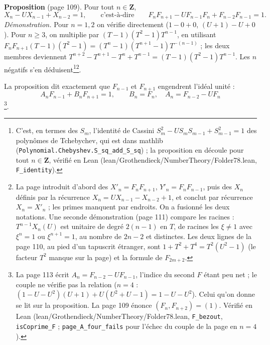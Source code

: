 \documentclass[11pt,a4paper]{article}
\begin{document}
\textbf{Proposition} (page 109). Pour tout $n \in \mathbf{Z}$,
\[
  X_n - U X_{n-1} + X_{n-2} = 1 , \qquad \text{c'est-à-dire} \qquad F_n
  F_{n+1} - U F_{n-1} F_n + F_{n-2} F_{n-1} = 1 .
\]
\emph{Démonstration.} Pour $n = 1, 2$ on vérifie directement ($1 - 0 + 0$,
$(U + 1) - U + 0$). Pour $n \geq 3$, on multiplie par $(T - 1)(T^2 - 1)
T^{n-1}$, en utilisant $F_n F_{n+1} (T - 1)(T^2 - 1) = (T^n - 1)(T^{n+1} - 1)
T^{-(n-1)}$ ; les deux membres deviennent $T^{n+2} - T^{n+1} - T^n + T^{n-1} =
(T - 1)(T^2 - 1) T^{n-1}$. Les $n$ négatifs s'en déduisent\footnote{C'est,
en termes des $S_m$, l'identité de Cassini
$S_m^{2} - U S_m S_{m-1} + S_{m-1}^{2} = 1$ des polynômes de Tchebychev, qui
est dans mathlib (\texttt{Polynomial.Chebyshev.S\_sq\_add\_S\_sq}) ; la
proposition en découle pour tout $n \in \mathbf{Z}$, vérifié en Lean
(lean/Grothendieck/NumberTheory/Folder78.lean, \texttt{F\_identity}).}\footnote{La page
introduit d'abord des $X'_n = F_n F_{n+1}$, $Y'_n = F_n F_{n-1}$, puis des
$X_n$ définis par la récurrence $X_n = U X_{n-1} - X_{n-2} + 1$, et conclut
par récurrence $X_n = X'_n$ ; les primes manquent par endroits. On a fusionné
les deux notations. Une seconde démonstration (page 111) compare les racines :
$T^{n-1} X_n(U)$ est unitaire de degré $2(n-1)$ en $T$, de racines les $\xi
\neq 1$ avec $\xi^n = 1$ ou $\xi^{n+1} = 1$, au nombre de $2n - 2$ et
distinctes. Les deux lignes de la page 110, au pied d'un tapuscrit étranger,
sont $1 + T^2 + T^4 = T^2 (U^2 - 1)$ (le facteur $T^2$ manque sur la page) et
la formule de $F_{2m+2}$.}.

La proposition dit exactement que $F_{n-1}$ et $F_{n+1}$ engendrent l'idéal
unité :
\[
  A_n F_{n-1} + B_n F_{n+1} = 1, \qquad B_n = F_n, \quad A_n = F_{n-2} - U F_n
\]
\footnote{La page 113 écrit $A_n = F_{n-2} - U F_{n-1}$, l'indice du second
$F$ étant peu net ; le couple ne vérifie pas la relation ($n = 4$ : $(1 - U -
U^2)(U + 1) + U(U^2 + U - 1) = 1 - U - U^2$). Celui qu'on donne se lit sur
la proposition. La page 109 énonce $(F_n, F_{n+2}) = (1)$. Vérifié en Lean
(lean/Grothendieck/NumberTheory/Folder78.lean, \texttt{F\_bezout}, \texttt{isCoprime\_F} ;
\texttt{page\_A\_four\_fails} pour l'échec du couple de la page en $n = 4$).}.
\end{document}
